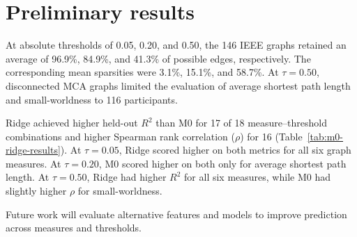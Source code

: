 \section{Preliminary results}

At absolute thresholds of 0.05, 0.20, and 0.50, the 146 IEEE graphs retained an average of 96.9\%, 84.9\%, and 41.3\% of possible edges, respectively. The corresponding mean sparsities were 3.1\%, 15.1\%, and 58.7\%. At $\tau=0.50$, disconnected MCA graphs limited the evaluation of average shortest path length and small-worldness to 116 participants.

Ridge achieved higher held-out $R^2$ than M0 for 17 of 18 measure--threshold combinations and higher Spearman rank correlation ($\rho$) for 16 (Table~\ref{tab:m0-ridge-results}). At $\tau=0.05$, Ridge scored higher on both metrics for all six graph measures. At $\tau=0.20$, M0 scored higher on both only for average shortest path length. At $\tau=0.50$, Ridge had higher $R^2$ for all six measures, while M0 had slightly higher $\rho$ for small-worldness.

Future work will evaluate alternative features and models to improve prediction across measures and thresholds.

